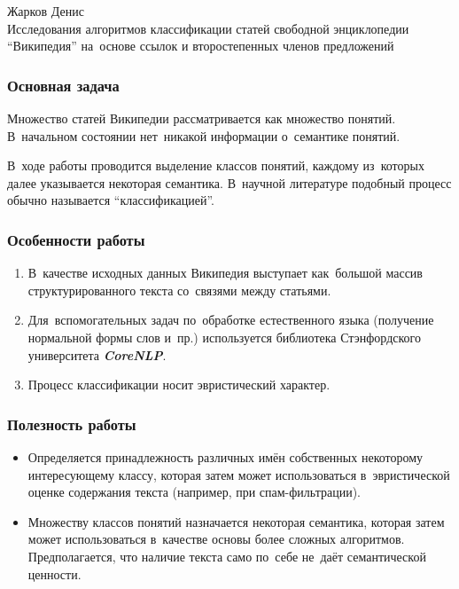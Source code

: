 \documentclass{beamer}
\newcommand{\MARK}[1]{{\bf {\it #1}}}
\begin{document}
\begin{frame}
\begin{center}
Жарков Денис\\
\vspace{1cm}
{\Large Исследования алгоритмов классификации статей свободной энциклопедии ``Википедия'' 
на~основе ссылок и второстепенных членов предложений}\\
\end{center}
\end{frame}

\begin{frame}
\frametitle{Основная задача}
Множество статей Википедии рассматривается как множество понятий.
В~начальном состоянии нет~никакой информации о~семантике понятий. 

\vspace{1cm}

В~ходе работы проводится выделение классов понятий, каждому из~которых далее указывается некоторая семантика.
В~научной литературе подобный процесс обычно называется ``классификацией''.
\end{frame}

\begin{frame}
\frametitle{Особенности работы}
\begin{enumerate}
\item {
В~качестве исходных данных Википедия выступает как~большой массив структурированного текста со~связями между статьями.
}

\item {
Для~вспомогательных задач по~обработке естественного языка (получение нормальной формы слов и~пр.) 
используется библиотека Стэнфордского университета \MARK{CoreNLP}.
}

\item{
Процесс классификации носит эвристический характер.
}
\end{enumerate}
\end{frame}

\begin{frame}
\frametitle{Полезность работы}

\begin{itemize}
\item {
Определяется принадлежность различных имён собственных некоторому интересующему классу,
которая затем может использоваться в~эвристической оценке содержания текста (например, при спам-фильтрации).
}

\item {
Множеству классов понятий назначается некоторая семантика, которая затем может использоваться в~качестве основы более сложных алгоритмов.
Предполагается, что наличие текста само по~себе не~даёт семантической ценности.
}
\end{itemize}

\end{frame}
\end{document}
